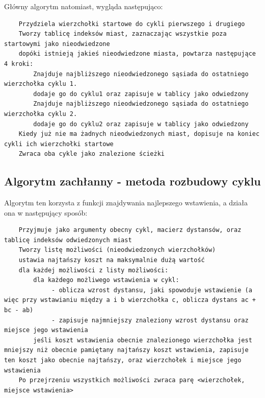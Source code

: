 \documentclass[11pt]{article}
\begin{document}
Główny algorytm natomiast, wygląda następująco: \\

\begin{verbatim}
    Przydziela wierzchołki startowe do cykli pierwszego i drugiego
    Tworzy tablicę indeksów miast, zaznaczając wszystkie poza startowymi jako nieodwiedzone
    dopóki istnieją jakieś nieodwiedzone miasta, powtarza następujące 4 kroki:
        Znajduje najbliższego nieodwiedzonego sąsiada do ostatniego wierzchołka cyklu 1.
        dodaje go do cyklu1 oraz zapisuje w tablicy jako odwiedzony
        Znajduje najbliższego nieodwiedzonego sąsiada do ostatniego wierzchołka cyklu 2.
        dodaje go do cyklu2 oraz zapisuje w tablicy jako odwiedzony
    Kiedy już nie ma żadnych nieodwiedzonych miast, dopisuje na koniec cykli ich wierzchołki startowe
    Zwraca oba cykle jako znalezione ścieżki

\end{verbatim}

\subsection{Algorytm zachłanny - metoda rozbudowy cyklu}\label{subsec:algorytm-zachanny---metoda-rozbudowy-cyklu}

Algorytm ten korzysta z funkcji znajdywania najlepszego wstawienia, a działa ona w następujący sposób:

\begin{verbatim}
    Przyjmuje jako argumenty obecny cykl, macierz dystansów, oraz tablicę indeksów odwiedzonych miast
    Tworzy listę możliwości (nieodwiedzonych wierzchołków)
    ustawia najtańszy koszt na maksymalnie dużą wartość
    dla każdej możliwości z listy możliwości:
        dla każdego możliwego wstawienia w cykl:
             - oblicza wzrost dystansu, jaki spowoduje wstawienie (a więc przy wstawianiu między a i b wierzchołka c, oblicza dystans ac + bc - ab)
             - zapisuje najmniejszy znaleziony wzrost dystansu oraz miejsce jego wstawienia
        jeśli koszt wstawienia obecnie znalezionego wierzchołka jest mniejszy niż obecnie pamiętany najtańszy koszt wstawienia, zapisuje ten koszt jako obecnie najtańszy, oraz wierzchołek i miejsce jego wstawienia
    Po przejrzeniu wszystkich możliwości zwraca parę <wierzchołek, miejsce wstawienia>

\end{verbatim}
\end{document}

